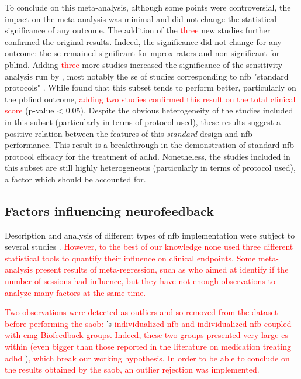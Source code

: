 To conclude on this meta-analysis, although some points were controversial, the impact on the
meta-analysis was minimal and did not change the statistical significance of any outcome. 
The addition of the \textcolor{red}{three} new studies \citep{Strehl2017, Baumeister2016, Bazanova2018} further confirmed the original results. Indeed, the
significance did not change for any outcome: the \gls{se} remained significant for \gls{mprox} raters and
non-significant for \gls{pblind}. Adding \textcolor{red}{three} more studies increased the significance of the sensitivity analysis run by
\citeauthor{Cortese2016}, most notably the \gls{se} of studies corresponding to \gls{nfb} "standard protocols" \citep{Arns2014}. 
While \citeauthor{Cortese2016} found that this subset tends to perform better, particularly on the \gls{pblind} outcome, 
\textcolor{red}{adding two studies confirmed this result on the total clinical score} (p-value < 0.05). Despite the obvious heterogeneity 
of the studies included in this subset (particularly in terms of protocol used), these results suggest a positive relation 
between the features of this \emph{standard} design and \gls{nfb} performance. This result is a breakthrough in the demonstration 
of standard \gls{nfb} protocol efficacy for the treatment of \gls{adhd}. Nonetheless, the  studies 
included in this subset are still highly heterogeneous (particularly in terms of protocol used), a factor which should be accounted for.


\subsection{Factors influencing neurofeedback}

Description and analysis of different types of \gls{nfb} implementation were subject to several studies \citep{Arns2014, 
Enriquez2017, Vernon2004, Jeunet2018}. \textcolor{red}{However, to the best of our knowledge none used three different statistical tools to quantify their influence on
clinical endpoints. Some meta-analysis present results of meta-regression, such as \citep{Cortese2016} who aimed at identify if the number of sessions had influence, but 
they have not enough observations to analyze many factors at the same time.}

\textcolor{red}{Two observations were detected as outliers and so removed from the dataset before performing the \gls{saob}: }\citeauthor{Bazanova2018}'s \textcolor{red}{individualized \gls{nfb} and 
individualized \gls{nfb} coupled with \gls{emg}-Biofeedback groups. Indeed, these two groups presented very large \gls{es}-within (even bigger than those reported in the literature on medication treating 
\gls{adhd}} \citep{Luan2017})\textcolor{red}{, which break our working hypothesis. In order to be able to conclude on the results obtained by the \gls{saob}, an outlier rejection was implemented.}

